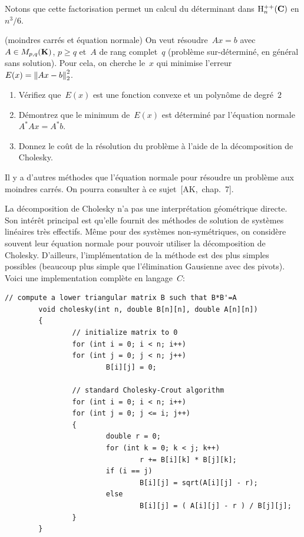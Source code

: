 Notons que cette factorisation permet un calcul du déterminant dans
$\mathrm{H}^{++}_n(\mathbf{C})$ en $n^3/6$.

\begin{exercice}(moindres carrés et équation normale)
On veut résoudre~$Ax=b$ avec~$A\in M_{p,q}(\mathbf{K})$, $p\ge q$ et~$A$ de rang
complet~$q$ (problème sur-déterminé, en général sans solution).  Pour cela,
on cherche le~$x$ qui minimise l'erreur~$E(x)=\left\|Ax-b\right\|^2_2$.
\begin{enumerate}
	\item Vérifiez que~$E(x)$ est une fonction convexe et un polynôme de
		degré~$2$
	\item Démontrez que le minimum de~$E(x)$ est déterminé par l'équation
		normale~$A^*Ax=A^*b$.
	\item Donnez le coût de la résolution du problème à l'aide de la
		décomposition de Cholesky.
\end{enumerate}
\end{exercice}

\begin{remark}
Il y a d'autres méthodes que l'équation normale pour résoudre un problème aux
moindres carrés. On pourra consulter à ce sujet~[AK,~chap.~7].
\end{remark}

La décomposition de Cholesky n'a pas une interprétation géométrique directe.
Son intérêt principal est qu'elle fournit des méthodes de solution de
systèmes linéaires très effectifs.  Même pour des systèmes non-symétriques,
on considère souvent leur équation normale pour pouvoir utiliser la
décomposition de Cholesky.  D'ailleurs, l'implémentation de la méthode est
des plus simples possibles (beaucoup plus simple que l'élimination Gausienne
avec des pivots).  Voici une implementation complète en langage~$C$:


\begin{Verbatim}[fontsize=\scriptsize]
        // compute a lower triangular matrix B such that B*B'=A
        void cholesky(int n, double B[n][n], double A[n][n])
        {
                // initialize matrix to 0
                for (int i = 0; i < n; i++)
                for (int j = 0; j < n; j++)
                        B[i][j] = 0;

                // standard Cholesky-Crout algorithm
                for (int i = 0; i < n; i++)
                for (int j = 0; j <= i; j++)
                {
                        double r = 0;
                        for (int k = 0; k < j; k++)
                                r += B[i][k] * B[j][k];
                        if (i == j)
                                B[i][j] = sqrt(A[i][j] - r);
                        else
                                B[i][j] = ( A[i][j] - r ) / B[j][j];
                }
        }
\end{Verbatim}

